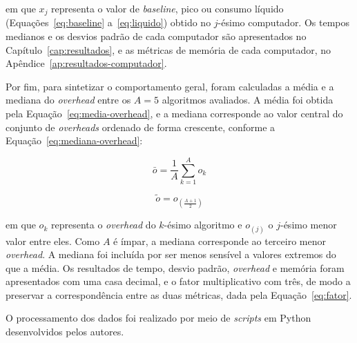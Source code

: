 \noindent em que $x_j$ representa o valor de \emph{baseline}, pico ou consumo líquido (Equações~\eqref{eq:baseline} a~\eqref{eq:liquido}) obtido no $j$-ésimo computador. Os tempos medianos e os desvios padrão de cada computador são apresentados no Capítulo~\ref{cap:resultados}, e as métricas de memória de cada computador, no Apêndice~\ref{ap:resultados-computador}.

Por fim, para sintetizar o comportamento geral, foram calculadas a média e a mediana do \emph{overhead} entre os $A = 5$ algoritmos avaliados. A média foi obtida pela Equação~\eqref{eq:media-overhead}, e a mediana corresponde ao valor central do conjunto de \emph{overheads} ordenado de forma crescente, conforme a Equação~\eqref{eq:mediana-overhead}:

\begin{equation}
\label{eq:media-overhead}
\bar{o} = \frac{1}{A} \sum_{k=1}^{A} o_k
\end{equation}

\begin{equation}
\label{eq:mediana-overhead}
\tilde{o} = o_{\left(\frac{A+1}{2}\right)}
\end{equation}

\noindent em que $o_k$ representa o \emph{overhead} do $k$-ésimo algoritmo e $o_{(j)}$ o $j$-ésimo menor valor entre eles. Como $A$ é ímpar, a mediana corresponde ao terceiro menor \emph{overhead}. A mediana foi incluída por ser menos sensível a valores extremos do que a média. Os resultados de tempo, desvio padrão, \emph{overhead} e memória foram apresentados com uma casa decimal, e o fator multiplicativo com três, de modo a preservar a correspondência entre as duas métricas, dada pela Equação~\eqref{eq:fator}.

O processamento dos dados foi realizado por meio de \emph{scripts} em Python desenvolvidos pelos autores.
